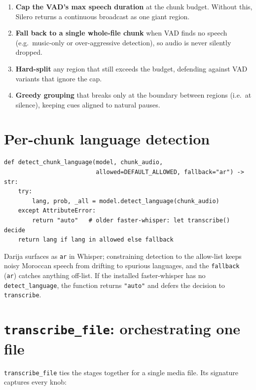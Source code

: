 \documentclass[11pt,a4paper]{report}
\newcommand{\code}[1]{\texttt{\small #1}}
\begin{document}
\begin{enumerate}[leftmargin=1.6em]
  \item \textbf{Cap the VAD's max speech duration} at the chunk budget. Without
        this, Silero returns a continuous broadcast as one giant region.
  \item \textbf{Fall back to a single whole-file chunk} when VAD finds no speech
        (e.g.\ music-only or over-aggressive detection), so audio is never
        silently dropped.
  \item \textbf{Hard-split} any region that still exceeds the budget, defending
        against VAD variants that ignore the cap.
  \item \textbf{Greedy grouping} that breaks only at the boundary between regions
        (i.e.\ at silence), keeping cues aligned to natural pauses.
\end{enumerate}

\section{Per-chunk language detection}

\begin{lstlisting}[caption={Constrained language detection.}]
def detect_chunk_language(model, chunk_audio,
                          allowed=DEFAULT_ALLOWED, fallback="ar") -> str:
    try:
        lang, prob, _all = model.detect_language(chunk_audio)
    except AttributeError:
        return "auto"   # older faster-whisper: let transcribe() decide
    return lang if lang in allowed else fallback
\end{lstlisting}

Darija surfaces as \code{ar} in Whisper; constraining detection to the allow-list
keeps noisy Moroccan speech from drifting to spurious languages, and the
\code{fallback} (\code{ar}) catches anything off-list. If the installed
faster-whisper has no \code{detect\_language}, the function returns \code{"auto"}
and defers the decision to \code{transcribe}.

\section{\texttt{transcribe\_file}: orchestrating one file}

\code{transcribe\_file} ties the stages together for a single media file. Its
signature captures every knob:
\end{document}
